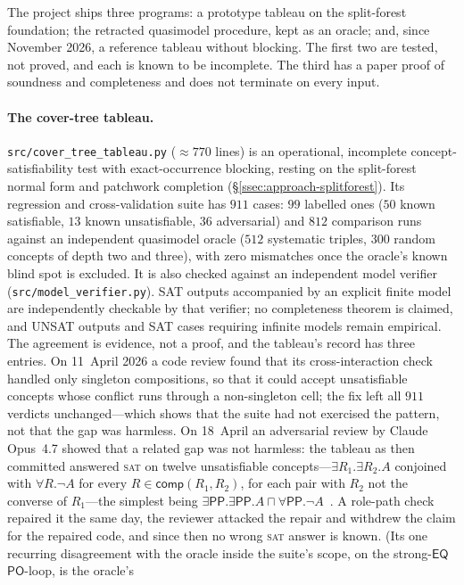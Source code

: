 \documentclass[11pt]{article}
\newcommand{\PO}{\mathsf{PO}}
\newcommand{\PP}{\mathsf{PP}}
\newcommand{\EQ}{\mathsf{EQ}}
\newcommand{\comp}{\ensuremath{\mathsf{comp}}}
\theoremstyle{plain}
\theoremstyle{definition}
\begin{document}
The project ships three programs: a prototype tableau on the split-forest
foundation; the retracted quasimodel procedure, kept as an oracle; and, since
November 2026, a reference tableau without blocking. The first two are tested,
not proved, and each is known to be incomplete. The third has a paper proof of
soundness and completeness and does not terminate on every input.

\paragraph{The cover-tree tableau.} \texttt{src/cover\_tree\_tableau.py}
($\approx 770$ lines) is an operational, incomplete concept-satisfiability
test with exact-occurrence blocking, resting on the split-forest normal form
and patchwork completion (\S\ref{ssec:approach-splitforest}). Its
regression and cross-validation suite has $911$ cases: $99$ labelled ones
($50$ known satisfiable, $13$ known unsatisfiable, $36$ adversarial) and
$812$ comparison runs against an independent quasimodel oracle ($512$
systematic triples, $300$ random concepts of depth two and three), with zero
mismatches once the oracle's known blind spot is excluded. It is also checked
against an independent model verifier
(\texttt{src/model\_verifier.py}). SAT outputs accompanied by an explicit
finite model are independently checkable by that verifier; no completeness
theorem is claimed, and UNSAT outputs and SAT cases requiring infinite
models remain empirical. The agreement is evidence, not a proof, and the
tableau's record has three entries. On 11~April 2026 a code review found that
its cross-interaction check handled only singleton compositions, so that it
could accept unsatisfiable concepts whose conflict runs through a
non-singleton cell; the fix left all $911$ verdicts unchanged---which shows
that the suite had not exercised the pattern, not that the gap was harmless.
On 18~April an adversarial review by Claude Opus~4.7 showed that a related gap
was not harmless: the tableau as then committed answered \textsc{sat} on
twelve unsatisfiable concepts---$\exists R_1.\exists R_2.A$ conjoined with
$\forall R.\neg A$ for every $R\in\comp(R_1,R_2)$, for each pair with $R_2$
not the converse of $R_1$---the simplest being
$\exists\PP.\exists\PP.A\sqcap\forall\PP.\neg A$~\cite{Opus47TableauReview}.
A role-path check repaired it the same day, the reviewer attacked the repair
and withdrew the claim for the repaired code, and since then no wrong
\textsc{sat} answer is known. (Its one recurring disagreement with the oracle
inside the suite's scope, on the strong-$\EQ$ $\PO$-loop, is the oracle's
\end{document}
